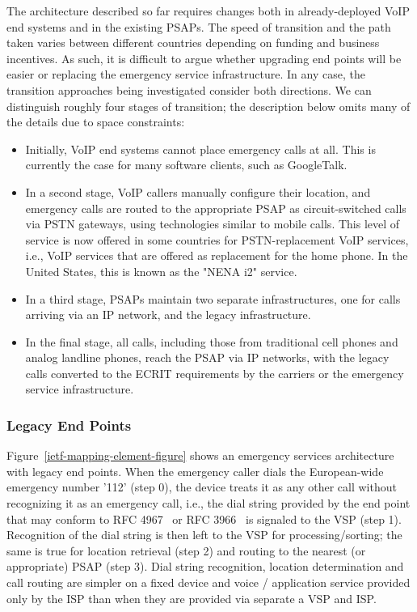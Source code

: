 \documentclass[12pt]{article}
\begin{document}
The architecture described so far requires changes both in already-deployed VoIP end systems and in the existing PSAPs. The speed of transition and the path taken varies between different countries depending on funding and business incentives. As such, it is difficult to argue whether upgrading end points will be easier or replacing the emergency service infrastructure. In any case, the transition approaches being investigated consider both directions. We can distinguish roughly four stages of transition; the description below omits many of the details due to space constraints:
\begin{itemize}
\item Initially, VoIP end systems cannot place emergency calls at all. This is currently the case for many software clients, such as GoogleTalk.
\item In a second stage, VoIP callers manually configure their location, and emergency calls are routed to the appropriate PSAP as circuit-switched calls via PSTN gateways, using technologies similar to mobile calls. This level of service is now offered in some countries for PSTN-replacement VoIP services, i.e., VoIP services that are offered as replacement for the home phone. In the United States, this is known as the "NENA i2" service.
\item In a third stage, PSAPs maintain two separate infrastructures, one for calls arriving via an IP network, and the legacy infrastructure.
\item In the final stage, all calls, including those from traditional cell phones and analog landline phones, reach the PSAP via IP networks, with the legacy calls converted to the ECRIT requirements by the carriers or the emergency service infrastructure.
\end{itemize}

\subsubsection{Legacy End Points\\}

Figure~\ref{ietf-mapping-element-figure} shows an emergency services architecture with legacy end points. When the emergency caller dials the European-wide emergency number '112' (step 0), the device treats it as any other call without recognizing it as an emergency call, i.e., the dial string provided by the end point that may conform to RFC 4967~\cite{rfc4967} or RFC 3966~\cite{rfc3966} is signaled to the VSP (step 1). Recognition of the dial string is then left to the VSP for processing/sorting; the same is true for location retrieval (step 2) and routing to the nearest (or appropriate) PSAP (step 3). Dial string recognition, location determination and call routing are simpler on a fixed device and voice / application service provided only by the ISP than when they are provided via separate a VSP and ISP. 
\end{document}
